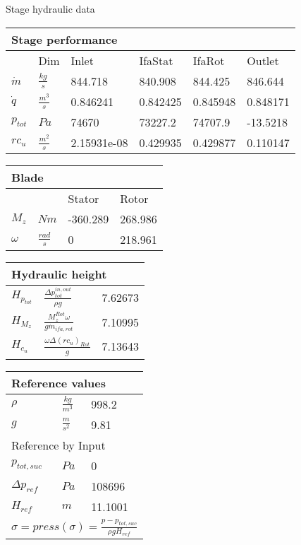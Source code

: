 {\huge Stage hydraulic data}
\vspace{20pt}\newline
\begin{tabular}{|l|l|l|l|l|l|}
\multicolumn{6}{l}{Stage performance} \\ 
\hline
& Dim & Inlet& IfaStat & IfaRot  & Outlet \\ 
\hline
$\dot m $ & $\frac{kg}{s}$ & 844.718 & 840.908 & 844.425 & 846.644 \\ 
\hline
$\dot q$ & $\frac{m^3}{s}$ & 0.846241 & 0.842425 & 0.845948 & 0.848171 \\ 
\hline
$p_{tot}$ & $Pa$ & 74670 & 73227.2 & 74707.9 & -13.5218 \\ 
\hline
$rc_u$ & $\frac{m^2}{s}$ & 2.15931e-08 & 0.429935 & 0.429877 & 0.110147 \\ 
\hline
\end{tabular}
\vspace{20pt}\newline
\begin{tabular}{|l|l|l|l|}
\multicolumn{4}{l}{Blade} \\ 
\hline
& & Stator & Rotor\\ 
\hline
$M_z$ &$Nm$ & -360.289& 268.986\\ 
\hline
$\omega$ & $\frac{rad}{s}$ & 0& 218.961\\ 
\hline
\end{tabular}
\vspace{20pt}\newline
\begin{tabular}{|l|l|l|}
\multicolumn{3}{l}{Hydraulic height} \\ 
\hline
$H_{p_{tot}}$ &$\frac{\Delta p^{in,out}_{tot}}{\rho g}$ & 7.62673 \\ 
\hline
$H_{M_z}$ &$\frac{M_z^{Rot} \omega}{g \dot m_{ifa,rot}}$ & 7.10995 \\ 
\hline
$H_{c_u}$ &$\frac{\omega \Delta(r c_u)_{Rot} }{g}$ & 7.13643 \\ 
\hline
\end{tabular}
\vspace{20pt}\newline
\begin{tabular}{|l|l|l|}
\multicolumn{3}{l}{Reference values} \\ 
\hline
$\rho$ &$\frac{kg}{m^3}$ & 998.2 \\ 
\hline
$g$ &$\frac{m}{s^2}$ & 9.81 \\ 
\hline
\multicolumn{3}{|l|}{Reference by Input} \\ 
\hline
$p_{tot,suc}$ &$Pa$ & 0 \\ 
\hline
$\Delta p_{ref}$ &$Pa$ & 108696 \\ 
\hline
$H_{ref}$ &$m$ & 11.1001 \\ 
\hline
\multicolumn{3}{|l|}{$\sigma = press(\sigma) = \frac{p-p_{tot,suc}}{\rho g H_{ref}}$} \\ 
\hline
\end{tabular}
